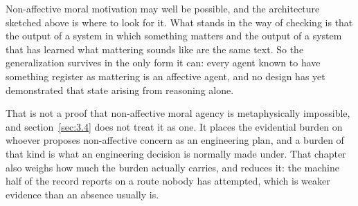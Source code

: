 Non-affective moral motivation may well be possible, and the architecture sketched above is where to look for it. What stands in the way of checking is that the output of a system in which something matters and the output of a system that has learned what mattering sounds like are the same text. So the generalization survives in the only form it can: every agent known to have something register as mattering is an affective agent, and no design has yet demonstrated that state arising from reasoning alone.

That is not a proof that non-affective moral agency is metaphysically impossible, and section~\ref{sec:3.4} does not treat it as one. It places the evidential burden on whoever proposes non-affective concern as an engineering plan, and a burden of that kind is what an engineering decision is normally made under. That chapter also weighs how much the burden actually carries, and reduces it: the machine half of the record reports on a route nobody has attempted, which is weaker evidence than an absence usually is.

